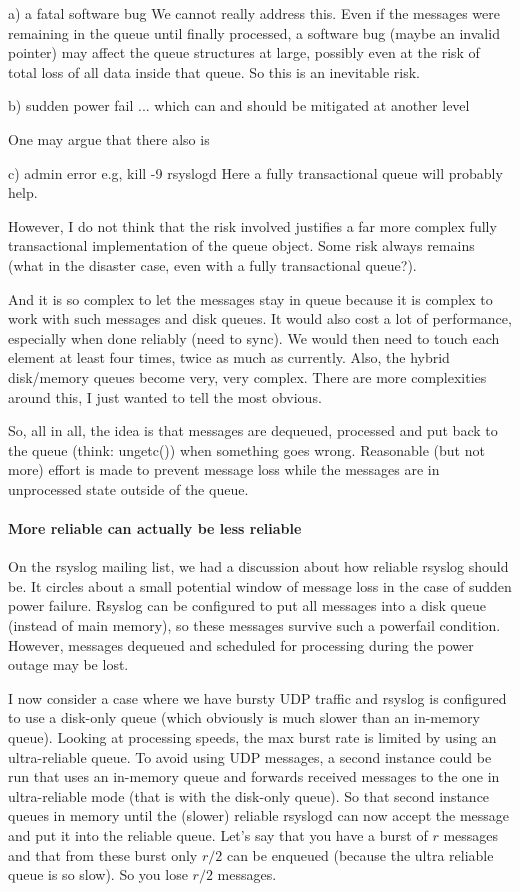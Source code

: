 \documentclass[a4paper,10pt]{article}
\begin{document}
a) a fatal software bug
We cannot really address this. Even if the messages were remaining in the
queue until finally processed, a software bug (maybe an invalid pointer) may
affect the queue structures at large, possibly even at the risk of total loss
of all data inside that queue. So this is an inevitable risk.

b) sudden power fail
... which can and should be mitigated at another level

One may argue that there also is

c) admin error
e.g, kill -9 rsyslogd
Here a fully transactional queue will probably help.

However, I do not think that the risk involved justifies a far more complex
fully transactional implementation of the queue object. Some risk always
remains (what in the disaster case, even with a fully transactional queue?).

And it is so complex to let the messages stay in queue because it is complex
to work with such messages and disk queues. It would also cost a lot of
performance, especially when done reliably (need to sync). We would then need
to touch each element at least four times, twice as much as currently. Also,
the hybrid disk/memory queues become very, very complex. There are more
complexities around this, I just wanted to tell the most obvious.

So, all in all, the idea is that messages are dequeued, processed and put
back to the queue (think: ungetc()) when something goes wrong. Reasonable
(but not more) effort is made to prevent message loss while the messages are
in unprocessed state outside of the queue.

\paragraph{More reliable can actually be less reliable}
On the rsyslog mailing list, we had a discussion about how reliable rsyslog should be. It circles about a small potential window of message loss in the case of sudden power failure. Rsyslog can be configured to put all messages into a disk queue (instead of main memory), so these messages survive such a powerfail condition. However, messages dequeued and scheduled for processing during the power outage may be lost. 

I now consider a case where we have bursty UDP traffic and rsyslog is configured to use a disk-only queue (which obviously is much slower than an in-memory queue). Looking at processing speeds, the max burst rate is limited by using an ultra-reliable queue. To avoid using UDP messages, a second instance could be run that uses an in-memory queue and forwards received messages to the one in ultra-reliable mode (that is with the disk-only queue). So that second instance queues in memory until the (slower) reliable rsyslogd can now accept the message and put it into the reliable queue. Let's say that you have a burst of $r$ messages and that from these burst only $r/2$ can be enqueued (because the ultra reliable queue is so slow). So you lose $r/2$ messages.
\end{document}
